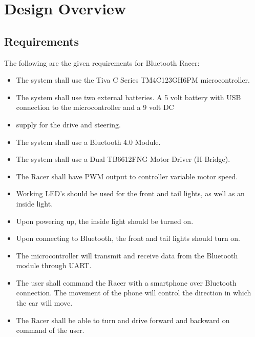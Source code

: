 \documentclass[12pt]{article}
\begin{document}
\section{Design Overview}
\subsection{Requirements}
The following are the given requirements for Bluetooth Racer:
\begin{itemize}
\item The system shall use the Tiva C Series TM4C123GH6PM microcontroller.
\item The system shall use two external batteries. A 5 volt battery with USB connection to the microcontroller and a 9 volt DC \item supply for the drive and steering.
\item The system shall use a Bluetooth 4.0 Module.
\item The system shall use a Dual TB6612FNG Motor Driver (H-Bridge).
\item The Racer shall have PWM output to controller variable motor speed.
\item Working LED’s should be used for the front and tail lights, as well as an inside light.
\item Upon powering up, the inside light should be turned on. 
\item Upon connecting to Bluetooth, the front and tail lights should turn on. 
\item The microcontroller will transmit and receive data from the Bluetooth module through UART.
\item The user shall command the Racer with a smartphone over Bluetooth connection. The movement of the phone will control the direction in which the car will move.
\item The Racer shall be able to turn and drive forward and backward on command of the user.
\end{itemize}  
\end{document}
